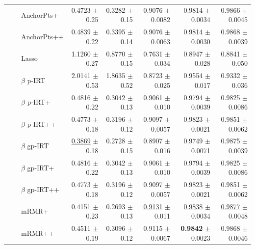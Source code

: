 \begin{longtable}{llp{}rrrrr}
 &  & AnchorPts+ & 0.4723 {\scriptsize $\pm$ 0.25} & 0.3282 {\scriptsize $\pm$ 0.15} & 0.9076 {\scriptsize $\pm$ 0.0082} & 0.9814 {\scriptsize $\pm$ 0.0034} & 0.9866 {\scriptsize $\pm$ 0.0045} \\
 &  & AnchorPts++ & 0.4839 {\scriptsize $\pm$ 0.22} & 0.3395 {\scriptsize $\pm$ 0.14} & 0.9076 {\scriptsize $\pm$ 0.0063} & 0.9814 {\scriptsize $\pm$ 0.0030} & 0.9868 {\scriptsize $\pm$ 0.0039} \\
 &  & Lasso & 1.1260 {\scriptsize $\pm$ 0.27} & 0.8770 {\scriptsize $\pm$ 0.15} & 0.7631 {\scriptsize $\pm$ 0.034} & 0.8947 {\scriptsize $\pm$ 0.028} & 0.8841 {\scriptsize $\pm$ 0.050} \\
 &  & $\beta$ p-IRT & 2.0141 {\scriptsize $\pm$ 0.53} & 1.8635 {\scriptsize $\pm$ 0.52} & 0.8723 {\scriptsize $\pm$ 0.025} & 0.9554 {\scriptsize $\pm$ 0.017} & 0.9332 {\scriptsize $\pm$ 0.036} \\
 &  & $\beta$ p-IRT+ & 0.4816 {\scriptsize $\pm$ 0.22} & 0.3042 {\scriptsize $\pm$ 0.13} & 0.9061 {\scriptsize $\pm$ 0.010} & 0.9794 {\scriptsize $\pm$ 0.0039} & 0.9825 {\scriptsize $\pm$ 0.0086} \\
 &  & $\beta$ p-IRT++ & 0.4773 {\scriptsize $\pm$ 0.18} & 0.3196 {\scriptsize $\pm$ 0.12} & 0.9097 {\scriptsize $\pm$ 0.0057} & 0.9823 {\scriptsize $\pm$ 0.0021} & 0.9851 {\scriptsize $\pm$ 0.0062} \\
 &  & $\beta$ gp-IRT & \underline{0.3869} {\scriptsize $\pm$ 0.18} & 0.2728 {\scriptsize $\pm$ 0.15} & 0.8907 {\scriptsize $\pm$ 0.016} & 0.9749 {\scriptsize $\pm$ 0.0071} & 0.9875 {\scriptsize $\pm$ 0.0039} \\
 &  & $\beta$ gp-IRT+ & 0.4816 {\scriptsize $\pm$ 0.22} & 0.3042 {\scriptsize $\pm$ 0.13} & 0.9061 {\scriptsize $\pm$ 0.010} & 0.9794 {\scriptsize $\pm$ 0.0039} & 0.9825 {\scriptsize $\pm$ 0.0086} \\
 &  & $\beta$ gp-IRT++ & 0.4773 {\scriptsize $\pm$ 0.18} & 0.3196 {\scriptsize $\pm$ 0.12} & 0.9097 {\scriptsize $\pm$ 0.0057} & 0.9823 {\scriptsize $\pm$ 0.0021} & 0.9851 {\scriptsize $\pm$ 0.0062} \\
 &  & mRMR+ & 0.4151 {\scriptsize $\pm$ 0.23} & 0.2693 {\scriptsize $\pm$ 0.13} & \underline{0.9131} {\scriptsize $\pm$ 0.011} & \underline{0.9838} {\scriptsize $\pm$ 0.0034} & \underline{0.9877} {\scriptsize $\pm$ 0.0048} \\
 &  & mRMR++ & 0.4511 {\scriptsize $\pm$ 0.19} & 0.3096 {\scriptsize $\pm$ 0.12} & 0.9115 {\scriptsize $\pm$ 0.0067} & \textbf{0.9842} {\scriptsize $\pm$ 0.0023} & 0.9868 {\scriptsize $\pm$ 0.0046} \\

\end{longtable}
